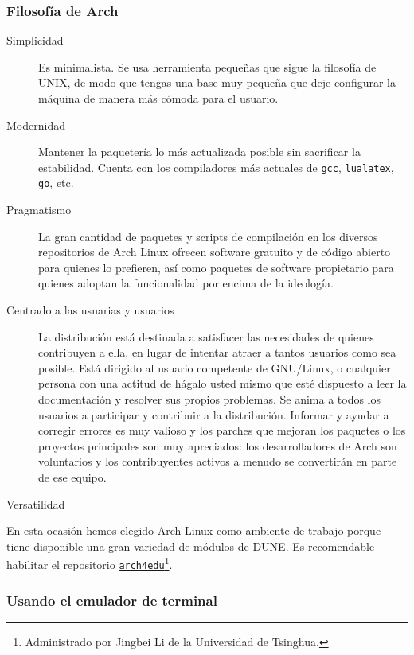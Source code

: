 \begin{frame}
	\frametitle{Filosofía de Arch}

	\begin{description}
		\item[Simplicidad]
			Es minimalista.
			Se usa herramienta pequeñas que sigue la filosofía de UNIX, de modo que tengas una base muy pequeña que deje configurar la máquina de manera más cómoda para el usuario.
		\item[Modernidad]
			Mantener la paquetería lo más actualizada posible sin sacrificar la estabilidad. Cuenta con los compiladores más actuales de \lstinline{gcc}, \lstinline{lualatex}, \lstinline{go}, etc.
		\item[Pragmatismo]
			La gran cantidad de paquetes y scripts de compilación en los diversos repositorios de Arch Linux ofrecen software gratuito y de código abierto para quienes lo prefieren, así como paquetes de software propietario para quienes adoptan la funcionalidad por encima de la ideología.
		\item[Centrado a las usuarias y usuarios]
			La distribución está destinada a satisfacer las necesidades de quienes contribuyen a ella, en lugar de intentar atraer a tantos usuarios como sea posible.
			Está dirigido al usuario competente de GNU/Linux, o cualquier persona con una actitud de hágalo usted mismo que esté dispuesto a leer la documentación y resolver sus propios problemas.
			Se anima a todos los usuarios a participar y contribuir a la distribución.
			Informar y ayudar a corregir errores es muy valioso y los parches que mejoran los paquetes o los proyectos principales son muy apreciados: los desarrolladores de Arch son voluntarios y los contribuyentes activos a menudo se convertirán en parte de ese equipo.
		\item[Versatilidad]
	\end{description}

\end{frame}

\begin{frame}

	En esta ocasión hemos elegido Arch Linux como ambiente de trabajo porque tiene disponible una gran variedad de módulos de DUNE.
	Es recomendable habilitar el repositorio \href{https://wiki.archlinux.org/title/Unofficial\_user\_repositories\#arch4edu}{\texttt{arch4edu}}\footnote{Administrado por Jingbei Li de la Universidad de Tsinghua.}.
\end{frame}

\begin{frame}
	\frametitle{Usando el emulador de terminal}



\end{frame}

